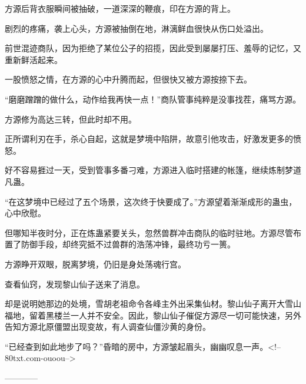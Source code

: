 \begin{this_body}
方源后背衣服瞬间被抽破，一道深深的鞭痕，印在方源的背上。

剧烈的疼痛，袭上心头，方源被抽倒在地，淋漓鲜血很快从伤口处溢出。

前世混迹商队，因为拒绝了某位公子的招揽，因此受到屡屡打压、羞辱的记忆，又重新鲜活起来。

一股愤怒之情，在方源的心中升腾而起，但很快又被方源按捺下去。

“磨磨蹭蹭的做什么，动作给我再快一点！”商队管事纯粹是没事找茬，痛骂方源。

方源修为高达三转，但此时却不用。

正所谓利刃在手，杀心自起，这就是梦境中陷阱，故意引他攻击，好激发更多的愤怒。

好不容易捱过一天，受到管事多番刁难，方源进入临时搭建的帐篷，继续炼制梦道凡蛊。

“在这梦境中已经过了五个场景，这次终于快要成了。”方源望着渐渐成形的蛊虫，心中欣慰。

但哪知半夜时分，正在炼蛊紧要关头，忽然兽群冲击商队的临时驻地。方源尽管布置了防御手段，却终究抵不过兽群的浩荡冲锋，最终功亏一篑。

方源睁开双眼，脱离梦境，仍旧是身处荡魂行宫。

查看仙窍，发现黎山仙子送来了消息。

却是说明她那边的处境，雪胡老祖命令各峰主外出采集仙材。黎山仙子离开大雪山福地，留着黑楼兰一人并不安全。因此，黎山仙子催促方源尽一切可能快速，另外告知方源北原僵盟出现变故，有人调查仙僵沙黄的身份。

“已经查到如此地步了吗？”昏暗的房中，方源皱起眉头，幽幽叹息一声。<!--80txt.com-ouoou-->

------------

\end{this_body}

